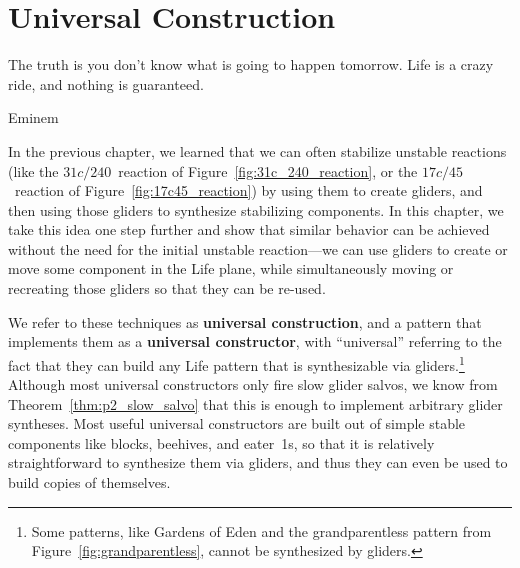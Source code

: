 
\renewcommand{\chapterfolder}{universal_construction/}
\chapter{Universal Construction}\label{chp:universal_construction}


\vspace*{-0.4in}
\epigraph{The truth is you don't know what is going to happen tomorrow. Life is a crazy ride, and nothing is guaranteed.}{Eminem}
\vspace*{0.4in}



\noindent In the previous chapter, we learned that we can often stabilize unstable reactions (like the $31c/240$~reaction of Figure~\ref{fig:31c_240_reaction}, or the $17c/45$~reaction of Figure~\ref{fig:17c45_reaction}) by using them to create gliders, and then using those gliders to synthesize stabilizing components. In this chapter, we take this idea one step further and show that similar behavior can be achieved without the need for the initial unstable reaction---we can use gliders to create or move some component in the Life plane, while simultaneously moving or recreating those gliders so that they can be re-used.

We refer to these techniques as \textbf{universal construction}, and a pattern that implements them as a \textbf{universal constructor}, with ``universal'' referring to the fact that they can build any Life pattern that is synthesizable via gliders.\footnote{Some patterns, like Gardens of Eden and the grandparentless pattern from Figure~\ref{fig:grandparentless}, cannot be synthesized by gliders.} Although most universal constructors only fire slow glider salvos, we know from Theorem~\ref{thm:p2_slow_salvo} that this is enough to implement arbitrary glider syntheses. Most useful universal constructors are built out of simple stable components like blocks, beehives, and eater~1s, so that it is relatively straightforward to synthesize them via gliders, and thus they can even be used to build copies of themselves.

